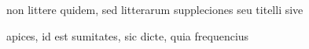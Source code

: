 non littere quidem, sed litterarum suppleciones seu titelli sive 

apices, id est sumitates, sic dicte, quia frequencius 



















